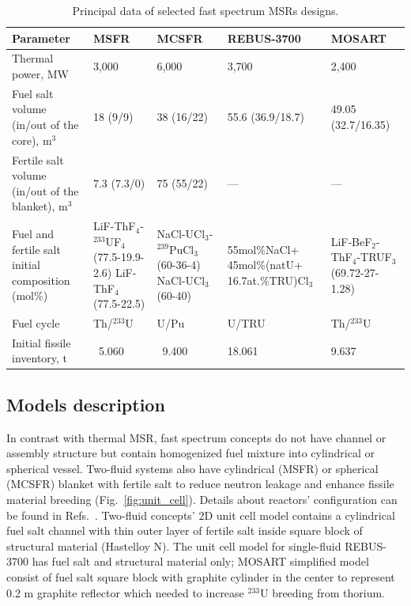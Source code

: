 \documentclass{anstrans}
\begin{document}
\begin{table}[!htb]
  \centering
  \caption{Principal data of selected fast spectrum \glspl{MSR} designs.}
  \label{table:fsmsr_concepts} 
  \begin{tabular}{p{} p{} p{} p{} p{}} \toprule 
   Parameter & \gls{MSFR} & \gls{MCSFR} & REBUS-3700 & \gls{MOSART} \\ \midrule
   Thermal power, MW 				&  3,000 & 6,000     & 3,700 & 2,400   \\ 
   Fuel salt volume (in/out of the core), m$^3$       &18 (9/9)& 38 (16/22)& 55.6 (36.9/18.7) & 49.05 (32.7/16.35) \\ 
   Fertile salt volume (in/out of the blanket), m$^3$ & 7.3 (7.3/0) & 75 (55/22)    & --- & --- \\
   Fuel and fertile salt initial composition (mol\%) & LiF-ThF$_4$-$^{233}$UF$_4$ (77.5-19.9-2.6) LiF-ThF$_4$ \newline (77.5-22.5) & NaCl-UCl$_3$-$^{239}$PuCl$_3$ (60-36-4) \newline NaCl-UCl$_3$ \newline (60-40)    
   & 55mol\%NaCl+ 45mol\%(natU+ 16.7at.\%TRU)Cl$_3$ 
   & LiF-BeF$_2$-ThF$_4$-TRUF$_3$  \newline (69.72-27-1.28) \\
   Fuel cycle & Th/$^{233}$U & U/Pu  & U/TRU & Th/$^{233}$U \\
   Initial fissile inventory, t & \ 5.060 & \ 9.400    & 18.061 & 9.637 \\ \bottomrule 
  \end{tabular}
\end{table}

\subsection{Models description} 
\label{sec:model}
In contrast with thermal \gls{MSR}, fast spectrum concepts do not have channel or assembly structure but contain homogenized fuel mixture into cylindrical or spherical vessel. Two-fluid systems also have cylindrical (\gls{MSFR}) or spherical (\gls{MCSFR}) blanket with fertile salt to reduce neutron leakage and enhance fissile material breeding (Fig.~\ref{fig:unit_cell}). Details about reactors' configuration can be found in Refs.~\cite{noauthor_final_2015, simmons_assessment_1974, mourogov_potentialities_2006,ignatiev_molten_2014}. Two-fluid concepts' 2D unit cell model contains a cylindrical fuel salt channel with thin outer layer of fertile salt inside square block of structural material (Hastelloy N). The unit cell model for single-fluid REBUS-3700 has fuel salt and structural material only; \gls{MOSART} simplified model consist of fuel salt square block with graphite cylinder in the center to represent 0.2 m graphite reflector which needed to increase $^{233}$U breeding from thorium. 
\end{document}
